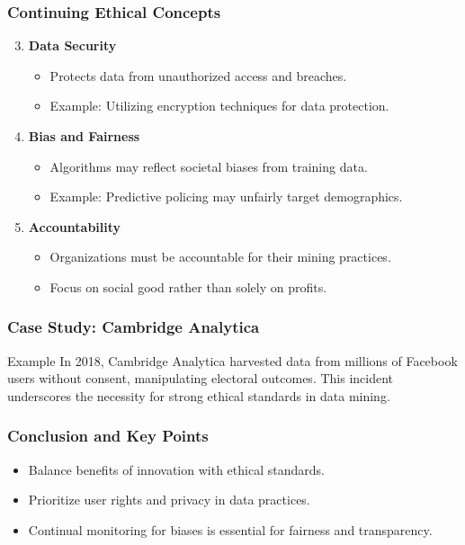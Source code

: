 \documentclass[aspectratio=169]{beamer}
\begin{document}
\begin{frame}[fragile]
    \frametitle{Continuing Ethical Concepts}
    \begin{enumerate}
        \setcounter{enumi}{2} %
        \item \textbf{Data Security}
            \begin{itemize}
                \item Protects data from unauthorized access and breaches.
                \item Example: Utilizing encryption techniques for data protection.
            \end{itemize}
        \item \textbf{Bias and Fairness}
            \begin{itemize}
                \item Algorithms may reflect societal biases from training data.
                \item Example: Predictive policing may unfairly target demographics.
            \end{itemize}
        \item \textbf{Accountability}
            \begin{itemize}
                \item Organizations must be accountable for their mining practices.
                \item Focus on social good rather than solely on profits.
            \end{itemize}
    \end{enumerate}
\end{frame}

\begin{frame}[fragile]
    \frametitle{Case Study: Cambridge Analytica}
    \begin{block}{Example}
        In 2018, Cambridge Analytica harvested data from millions of Facebook users without consent, manipulating electoral outcomes. 
        This incident underscores the necessity for strong ethical standards in data mining.
    \end{block}
\end{frame}

\begin{frame}[fragile]
    \frametitle{Conclusion and Key Points}
    \begin{itemize}
        \item Balance benefits of innovation with ethical standards.
        \item Prioritize user rights and privacy in data practices.
        \item Continual monitoring for biases is essential for fairness and transparency.
    \end{itemize}
\end{frame}
\end{document}
